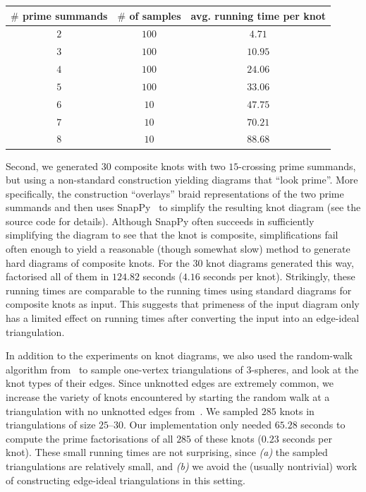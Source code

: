 \documentclass[10pt,a4paper]{amsart}
\begin{document}
\begin{center}
\begin{tabular}{c|c|c}
  $\#$ prime summands & $\#$ of samples & avg. running time per knot \\%
  \hline
  \hline
  $2$ & $100$ & $4.71$ \\%
  \hline
  $3$ & $100$ & $10.95$  \\%
  \hline
  $4$ & $100$ & $24.06$ \\%
  \hline
  $5$ & $100$ & $33.06$ \\%
  \hline
  $6$ & $10$ & $47.75$ \\%
  \hline
  $7$ & $10$ & $70.21$ \\%
  \hline
  $8$ & $10$ & $88.68$ %
\end{tabular}
\end{center}

Second, we generated $30$ composite knots with two $15$-crossing prime summands, but using
a non-standard construction yielding diagrams that ``look prime''. More specifically, the
construction ``overlays'' braid representations of the two prime summands and then uses
SnapPy~\cite{SnapPy} to simplify the resulting knot diagram (see the source code for
details). Although SnapPy often succeeds in sufficiently simplifying the diagram to see
that the knot is composite, simplifications fail often enough to yield a reasonable
(though somewhat slow) method to generate hard diagrams of composite knots. For the $30$
knot diagrams generated this way,  factorised all of them in $124.82$
seconds ($4.16$ seconds per knot). Strikingly, these running times are comparable to the
running times using standard diagrams for composite knots as input. This suggests that
primeness of the input diagram only has a limited effect on running times after converting
the input into an edge-ideal triangulation.

In addition to the experiments on knot diagrams, we also used the random-walk algorithm
from~\cite{AltmannMCMC} to sample one-vertex triangulations of $3$-spheres, and look at
the knot types of their edges. Since unknotted edges are extremely common, we increase the
variety of knots encountered by starting the random walk at a triangulation with no
unknotted edges from~\cite{burton2023counterexamples}. We sampled $285$ knots in
triangulations of size $25$--$30$.
Our implementation only needed $65.28$ seconds to compute the prime factorisations of all $285$ of these knots ($0.23$ seconds per knot).
These
small running times are not surprising, since \emph{(a)} the sampled triangulations are
relatively small, and \emph{(b)} we avoid the (usually nontrivial) work of constructing
edge-ideal triangulations in this setting.
\end{document}
